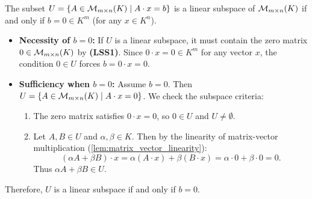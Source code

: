 \begin{exercisesolution*}
\label{sol:matrix_subspace_vector_constraint}
The subset $U = \{A \in \mathcal{M}_{m \times n}(K) \mid A \cdot x = b\}$ is a linear subspace of $\mathcal{M}_{m \times n}(K)$ if and only if $b = 0 \in K^m$ (for any $x \in K^n$).

\begin{itemize}
    \item \textbf{Necessity of $b = 0$:}
    If $U$ is a linear subspace, it must contain the zero matrix $0 \in \mathcal{M}_{m \times n}(K)$ by \textbf{(LSS1)}. Since $0 \cdot x = 0 \in K^m$ for any vector $x$, the condition $0 \in U$ forces $b = 0 \cdot x = 0$.

    \item \textbf{Sufficiency when $b = 0$:}
    Assume $b = 0$. Then $U = \{A \in \mathcal{M}_{m \times n}(K) \mid A \cdot x = 0\}$. We check the subspace criteria:
    \begin{enumerate}[label=\textbf{(\alph*)}]
        \item The zero matrix satisfies $0 \cdot x = 0$, so $0 \in U$ and $U \ne \emptyset$.
        \item Let $A, B \in U$ and $\alpha, \beta \in K$. Then by the linearity of matrix-vector multiplication (\cref{lem:matrix_vector_linearity}):
        \[
        (\alpha A + \beta B) \cdot x = \alpha (A \cdot x) + \beta (B \cdot x) = \alpha \cdot 0 + \beta \cdot 0 = 0.
        \]
        Thus $\alpha A + \beta B \in U$.
    \end{enumerate}
\end{itemize}
Therefore, $U$ is a linear subspace if and only if $b = 0$.
\end{exercisesolution*}

